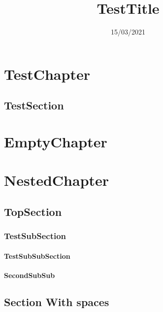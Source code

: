\documentclass{report}
\title{TestTitle}
\date{15/03/2021}
\begin{document}
\chapter{TestChapter}
\section{TestSection}
\chapter{EmptyChapter}
\chapter{NestedChapter}
\section{TopSection}
\subsection{TestSubSection}
\subsubsection{TestSubSubSection}
\subsubsection{SecondSubSub}
\section{Section With spaces}
\end{document}
